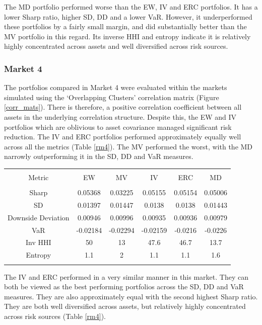 \documentclass[11pt,preprint, authoryear]{elsarticle}
\let\origtable\table
\let\endorigtable\endtable
\renewenvironment{table}[1][2] {
    \expandafter\origtable\expandafter[H]
} {
    \endorigtable
}
\numberwithin{equation}{section}
\numberwithin{figure}{section}
\numberwithin{table}{section}
\begin{document}
The MD portfolio performed worse than the EW, IV and ERC portfolios. It
has a lower Sharp ratio, higher SD, DD and a lower VaR. However, it
underperformed these portfolios by a fairly small margin, and did
substantially better than the MV portfolio in this regard. Its inverse
HHI and entropy indicate it is relatively highly concentrated across
assets and well diversified across risk sources.

\hypertarget{market-4}{%
\subsubsection{Market 4}\label{market-4}}

The portfolios compared in Market 4 were evaluated within the markets
simulated using the `Overlapping Clusters' correlation matrix (Figure
\ref{corr_mats}). There is therefore, a positive correlation coefficient
between all assets in the underlying correlation structure. Despite
this, the EW and IV portfolios which are oblivious to asset covariance
managed significant risk reduction. The IV and ERC portfolios performed
approximately equally well across all the metrics (Table \ref{rm4}). The
MV performed the worst, with the MD narrowly outperforming it in the SD,
DD and VaR measures.

\begin{table}[!htbp] \centering 
  \caption{Market 4 - Portfolio Risk Metrics} 
  \label{rm4} 
\begin{tabular}{@{\extracolsep{5pt}} cccccc} 
\\[-1.8ex]\hline 
\hline \\[-1.8ex] 
Metric & EW & MV & IV & ERC & MD \\ 
\hline \\[-1.8ex] 
Sharp & 0.05368 & 0.03225 & 0.05155 & 0.05154 & 0.05006 \\ 
SD & 0.01397 & 0.01447 & 0.0138 & 0.0138 & 0.01443 \\ 
Downside Deviation & 0.00946 & 0.00996 & 0.00935 & 0.00936 & 0.00979 \\ 
VaR & -0.02184 & -0.02294 & -0.02159 & -0.0216 & -0.0226 \\ 
Inv HHI & 50 & 13 & 47.6 & 46.7 & 13.7 \\ 
Entropy & 1.1 & 2 & 1.1 & 1.1 & 1.6 \\ 
\hline \\[-1.8ex] 
\end{tabular} 
\end{table}

The IV and ERC performed in a very similar manner in this market. They
can both be viewed as the best performing portfolios across the SD, DD
and VaR measures. They are also approximately equal with the second
highest Sharp ratio. They are both well diversified across assets, but
relatively highly concentrated across risk sources (Table \ref{rm4}).
\end{document}
